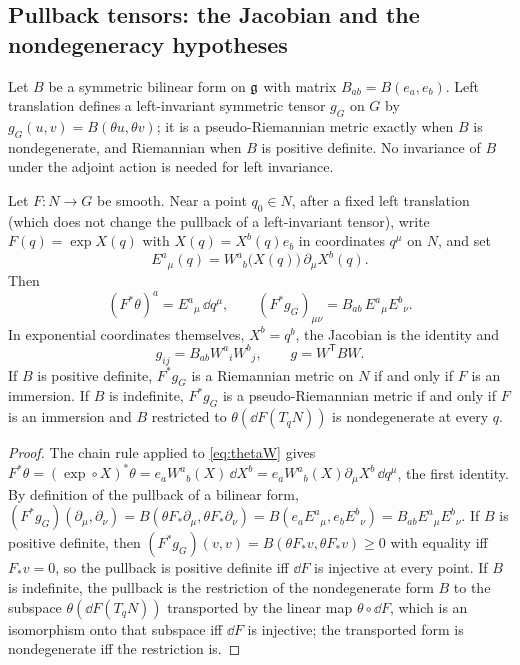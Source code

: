 \subsection{Pullback tensors: the Jacobian and the nondegeneracy hypotheses}
Let $B$ be a symmetric bilinear form on $\mathfrak{g}$ with matrix
$B_{ab}=B(e_a,e_b)$. Left translation defines a left-invariant symmetric
tensor $g_G$ on $G$ by $g_G(u,v)=B(\theta u,\theta v)$; it is a
pseudo-Riemannian metric exactly when $B$ is nondegenerate, and Riemannian
when $B$ is positive definite. No invariance of $B$ under the adjoint
action is needed for left invariance.

\begin{theorem}\label{thm:pullback}
Let $F:N\to G$ be smooth. Near a point $q_0\in N$, after a fixed left
translation (which does not change the pullback of a left-invariant
tensor), write $F(q)=\exp X(q)$ with $X(q)=X^b(q)e_b$ in coordinates
$q^\mu$ on $N$, and set
\begin{equation}\label{eq:E}
 E^a{}_\mu(q)=W^a{}_b\bigl(X(q)\bigr)\,\partial_\mu X^b(q).
\end{equation}
Then
\begin{equation}\label{eq:pullback}
 (F^*\theta)^a=E^a{}_\mu\,\dd q^\mu,\qquad
 (F^*g_G)_{\mu\nu}=B_{ab}\,E^a{}_\mu E^b{}_\nu.
\end{equation}
In exponential coordinates themselves, $X^b=q^b$, the Jacobian is the
identity and
\begin{equation}\label{eq:metricW}
 g_{ij}=B_{ab}W^a{}_iW^b{}_j,\qquad g=W^{\mathsf T}BW.
\end{equation}
If $B$ is positive definite, $F^*g_G$ is a Riemannian metric on $N$ if and
only if $F$ is an immersion. If $B$ is indefinite, $F^*g_G$ is a
pseudo-Riemannian metric if and only if $F$ is an immersion and $B$
restricted to $\theta(\dd F(T_qN))$ is nondegenerate at every $q$.
\end{theorem}
\begin{proof}
The chain rule applied to \eqref{eq:thetaW} gives
$F^*\theta=(\exp\circ X)^*\theta=e_aW^a{}_b(X)\,\dd X^b
=e_aW^a{}_b(X)\partial_\mu X^b\,\dd q^\mu$, the first identity. By
definition of the pullback of a bilinear form,
$(F^*g_G)(\partial_\mu,\partial_\nu)=B(\theta F_*\partial_\mu,\theta F_*\partial_\nu)
=B(e_aE^a{}_\mu,e_bE^b{}_\nu)=B_{ab}E^a{}_\mu E^b{}_\nu$. If $B$ is
positive definite, then $(F^*g_G)(v,v)=B(\theta F_*v,\theta F_*v)\geq0$
with equality iff $F_*v=0$, so the pullback is positive definite iff
$\dd F$ is injective at every point. If $B$ is indefinite, the pullback is
the restriction of the nondegenerate form $B$ to the subspace
$\theta(\dd F(T_qN))$ transported by the linear map $\theta\circ\dd F$,
which is an isomorphism onto that subspace iff $\dd F$ is injective; the
transported form is nondegenerate iff the restriction is.
\end{proof}
